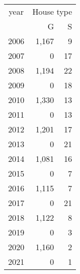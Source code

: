 \footnotesize\begin{tabular}[t]{lrr}
\toprule
\multicolumn{1}{c}{year} & \multicolumn{2}{c}{House type} \\
\cmidrule(l{3pt}r{3pt}){1-1} \cmidrule(l{3pt}r{3pt}){2-3}
  & G & S\\
\midrule
2006 & 1,167 & 9\\
2007 & 0 & 17\\
2008 & 1,194 & 22\\
2009 & 0 & 18\\
2010 & 1,330 & 13\\
2011 & 0 & 13\\
2012 & 1,201 & 17\\
2013 & 0 & 21\\
2014 & 1,081 & 16\\
2015 & 0 & 7\\
2016 & 1,115 & 7\\
2017 & 0 & 21\\
2018 & 1,122 & 8\\
2019 & 0 & 3\\
2020 & 1,160 & 2\\
2021 & 0 & 1\\
\bottomrule
\end{tabular}
